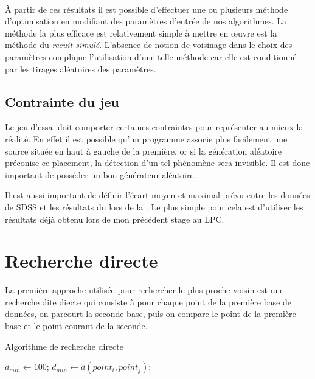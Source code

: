 \ 

À partir de ces résultats il est possible d'effectuer une ou plusieurs méthode d'optimisation en modifiant des paramètres d'entrée de nos algorithmes. La méthode la plus efficace est relativement simple à mettre en \oe{}uvre est la méthode du \emph{recuit-simulé}. L'absence de notion de voisinage dans le choix des paramètres complique l'utilisation d'une telle méthode car elle est conditionné par les tirages aléatoires des paramètres.

	\subsection{Contrainte du jeu}

Le jeu d'essai doit comporter certaines contraintes pour représenter au mieux la réalité. En effet il est possible qu'un programme associe plus facilement une source située en haut à gauche de la première, or si la génération aléatoire préconise ce placement, la détection d'un tel phénomène sera invisible. Il est donc important de posséder un bon générateur aléatoire.

Il est aussi important de définir l'écart moyen et maximal prévu entre les données de SDSS et les résultats du \stack{} lors de la \DC{}. Le plus simple pour cela est d'utiliser les résultats déjà obtenu lors de mon précédent stage au LPC.


\section{Recherche directe}

La première approche utilisée pour rechercher le plus proche voisin est une recherche dite diecte qui consiste à pour chaque point de la première base de données, on parcourt la seconde base, puis on compare le point de la première base et le point courant de la seconde.

	\begin{algorithm}
		\caption{Algorithme de recherche directe}
		\label{algo:direct-search}
		\begin{algorithmic}[1]
			\State $d_{min} \gets 100$; 
					  \label{l:condi:algo:direct-search}
						\State $d_{min} \gets d(point_i , point_j)$;
					\EndIf
				\EndFor
			\EndFor
		\end{algorithmic}
	\end{algorithm}

